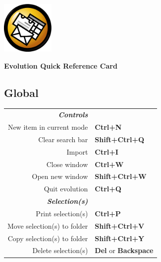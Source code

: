 \documentclass[12pt]{article}
\date {}
\begin{document}
	\begin{landscape}


	\begin{center}
	\begin{minipage}[m]
		{1in}\includegraphics[height=1in]{../evolution-logo.eps}\hspace{5mm}
	\end{minipage}
	\hspace{8mm}
	\textbf{\Huge{Evolution Quick Reference Card}}
	\end{center}

	\begin{center}
	\begin{multicols}{2}
	\section*{Global}
	\begin{tabular*}{4in}{rp{1.5in}}
		\textit{\textbf{Controls}}		&					\\
		New item in current mode		& \textbf{Ctrl+N}			\\
		Clear search bar			& \textbf{Shift+Ctrl+Q}			\\
		Import					& \textbf{Ctrl+I}			\\
		Close window				& \textbf{Ctrl+W}			\\
		Open new window				& \textbf{Shift+Ctrl+W}			\\
		\vspace{1.5mm}
		Quit evolution				& \textbf{Ctrl+Q}			\\
		\textit{\textbf{Selection(s)}}		&					\\
		Print selection(s)			& \textbf{Ctrl+P}			\\
		Move selection(s) to folder		& \textbf{Shift+Ctrl+V}			\\
		Copy selection(s) to folder		& \textbf{Shift+Ctrl+Y}			\\
		Delete selection(s)			& \textbf{Del} or \textbf{Backspace}	\\
	\end{tabular*}

\end{multicols}
\end{center}
\end{landscape}
\end{document}
